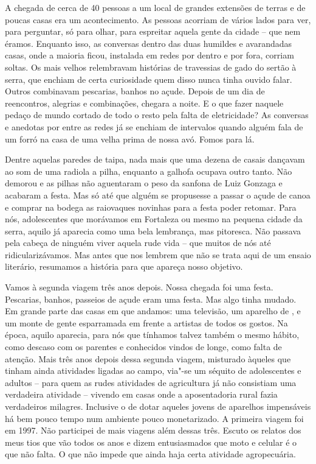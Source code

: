 A chegada de cerca de 40 pessoas a um local de grandes extensões de
terras e de poucas casas era um acontecimento. As pessoas acorriam de
vários lados para ver, para perguntar, só para olhar, para espreitar
aquela gente da cidade -- que nem éramos. Enquanto isso, as conversas
dentro das duas humildes e avarandadas casas, onde a maioria ficou,
instalada em redes por dentro e por fora, corriam soltas. Os mais velhos
relembravam histórias de travessias de gado do sertão à serra, que
enchiam de certa curiosidade quem disso nunca tinha ouvido falar. Outros
combinavam pescarias, banhos no açude. Depois de um dia de reencontros,
alegrias e combinações, chegara a noite. E o que fazer naquele pedaço de
mundo cortado de todo o resto pela falta de eletricidade? As conversas e
anedotas por entre as redes já se enchiam de intervalos quando alguém
fala de um forró na casa de uma velha prima de nossa avó. Fomos para lá.

Dentre aquelas paredes de taipa, nada mais que uma dezena de casais
dançavam ao som de uma radiola a pilha, enquanto a galhofa ocupava outro
tanto. Não demorou e as pilhas não aguentaram o peso da sanfona de Luiz
Gonzaga e acabaram a festa. Mas só até que alguém se propusesse a passar
o açude de canoa e comprar na bodega as raiovaques novinhas para a festa
poder retomar. Para nós, adolescentes que morávamos em Fortaleza ou
mesmo na pequena cidade da serra, aquilo já aparecia como uma bela
lembrança, mas pitoresca. Não passava pela cabeça de ninguém viver
aquela rude vida -- que muitos de nós até ridicularizávamos. Mas antes
que nos lembrem que não se trata aqui de um ensaio literário, resumamos
a história para que apareça nosso objetivo.

Vamos à segunda viagem três anos depois. Nossa chegada foi uma festa.
Pescarias, banhos, passeios de açude eram uma festa. Mas algo tinha
mudado. Em grande parte das casas em que andamos: uma televisão, um
aparelho de , e um monte de gente esparramada em frente a artistas de
todos os gostos. Na época, aquilo aparecia, para nós que tínhamos talvez
também o mesmo hábito, como descaso com os parentes e conhecidos vindos
de longe, como falta de atenção. Mais três anos depois dessa segunda
viagem, misturado àqueles que tinham ainda atividades ligadas ao campo,
via"-se um séquito de adolescentes e adultos -- para quem as rudes
atividades de agricultura já não consistiam uma verdadeira atividade --
vivendo em casas onde a aposentadoria rural fazia verdadeiros milagres.
Inclusive o de dotar aqueles jovens de aparelhos impensáveis há bem
pouco tempo num ambiente pouco monetarizado. A primeira viagem foi em
1997. Não participei de mais viagens além dessas três. Escuto os relatos
dos meus tios que vão todos os anos e dizem entusiasmados que moto e
celular é o que não falta. O que não impede que ainda haja certa
atividade agropecuária.

